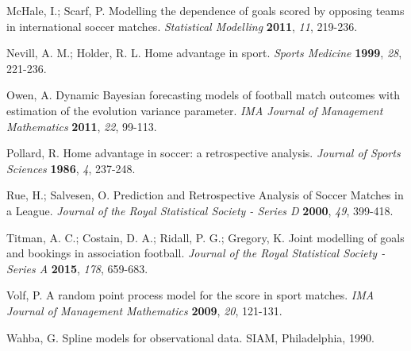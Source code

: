 \documentclass[journal,article,accept,moreauthors,pdftex,12pt,a4paper]{mdpi}
\begin{document}
\begin{thebibliography}{999}
			McHale, I.; Scarf, P. Modelling the dependence of goals scored by
			opposing teams in international soccer matches. {\em Statistical
				Modelling} {\bf 2011}, {\em 11}, 219-236.
			
			Nevill, A. M.; Holder, R. L. Home advantage in sport. {\em Sports
				Medicine} {\bf 1999}, {\em 28}, 221-236.
			
			Owen, A. Dynamic Bayesian forecasting models of football match
			outcomes with estimation of the evolution variance parameter. {\em
				IMA Journal of Management Mathematics} {\bf 2011}, {\em 22}, 99-113.
			
			Pollard, R. Home advantage in soccer: a retrospective analysis. {\em Journal of Sports Sciences} {\bf 1986}, {\em 4}, 237-248.
			
			Rue, H.; Salvesen, O. Prediction and Retrospective Analysis of
			Soccer Matches in a League. {\em Journal of the Royal Statistical
				Society - Series D} {\bf 2000}, {\em 49}, 399-418.
			
			Titman, A. C.; Costain, D. A.; Ridall, P. G.; Gregory, K. Joint
			modelling of goals and bookings in association football. {\em
				Journal of the Royal Statistical Society - Series A} {\bf 2015},
			{\em 178}, 659-683.
			
			Volf, P. A random point process model for the score in sport
			matches. {\em IMA Journal of Management Mathematics} {\bf 2009},
			{\em 20}, 121-131.
			
			Wahba, G. Spline models for observational data. SIAM, Philadelphia,
			1990.
			
		\end{thebibliography}
		
		
		
		
		
		
		
		
		
	
\end{document}
